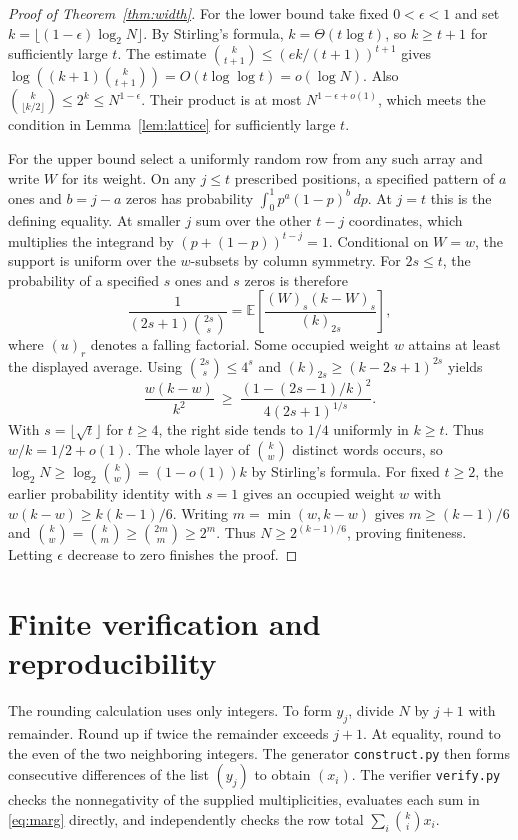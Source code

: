 \documentclass[11pt]{article}
\newcommand{\code}[1]{\texttt{#1}}
\begin{document}
\begin{proof}[Proof of Theorem~\ref{thm:width}]
For the lower bound take fixed $0<\epsilon<1$ and set
$k=\lfloor(1-\epsilon)\log_2 N\rfloor$. By Stirling's formula,
$k=\Theta(t\log t)$, so $k\ge t+1$ for sufficiently large $t$.
The estimate $\binom{k}{t+1}\le(ek/(t+1))^{t+1}$ gives
$\log((k+1)\binom{k}{t+1})=O(t\log\log t)=o(\log N)$.
Also $\binom{k}{\lfloor k/2\rfloor}\le 2^k\le N^{1-\epsilon}$.
Their product is at most \(N^{1-\epsilon+o(1)}\), which meets
the condition in Lemma~\ref{lem:lattice} for sufficiently large \(t\).

For the upper bound select a uniformly random row from any such array
and write $W$ for its weight. On any $j\le t$ prescribed positions, a
specified pattern of $a$ ones and $b=j-a$ zeros has probability
$\int_0^1p^a(1-p)^b\,dp$. At $j=t$ this is the defining equality.
At smaller $j$ sum over the other $t-j$ coordinates, which multiplies
the integrand by $(p+(1-p))^{t-j}=1$. Conditional on $W=w$, the support
is uniform over the $w$-subsets by column symmetry. For $2s\le t$, the
probability of a specified $s$ ones and $s$ zeros is therefore
\[
 \frac{1}{(2s+1)\binom{2s}{s}}
 =\mathbb E\!\left[\frac{(W)_s(k-W)_s}{(k)_{2s}}\right],
\]
where $(u)_r$ denotes a falling factorial. Some occupied weight $w$
attains at least the displayed average. Using $\binom{2s}{s}\le4^s$
and $(k)_{2s}\ge(k-2s+1)^{2s}$ yields
\[
 \frac{w(k-w)}{k^2}\ \ge\
 \frac{(1-(2s-1)/k)^2}{4(2s+1)^{1/s}}.
\]
With $s=\lfloor\sqrt t\rfloor$ for $t\ge4$, the right side tends to
$1/4$ uniformly in $k\ge t$. Thus $w/k=1/2+o(1)$. The whole layer
of $\binom{k}{w}$ distinct words occurs, so
$\log_2 N\ge\log_2\binom{k}{w}=(1-o(1))k$ by Stirling's formula.
For fixed \(t\ge2\), the earlier probability identity with \(s=1\)
gives an occupied weight \(w\) with \(w(k-w)\ge k(k-1)/6\).
Writing \(m=\min(w,k-w)\) gives \(m\ge(k-1)/6\) and
\(\binom{k}{w}=\binom{k}{m}\ge\binom{2m}{m}\ge2^m\).
Thus \(N\ge2^{(k-1)/6}\), proving finiteness.
Letting \(\epsilon\) decrease to zero finishes the proof.
\end{proof}

\section{Finite verification and reproducibility}\label{sec:computation}
The rounding calculation uses only integers. To form \(y_j\), divide
\(N\) by \(j+1\) with remainder. Round up if twice the remainder exceeds
\(j+1\). At equality, round to the even of the two neighboring
integers. The generator \code{construct.py} then forms consecutive
differences of the list \((y_j)\) to obtain \((x_i)\). The verifier
\code{verify.py} checks the nonnegativity of the supplied multiplicities,
evaluates each sum in \eqref{eq:marg} directly, and independently
checks the row total \(\sum_i\binom{k}{i}x_i\).
\end{document}
